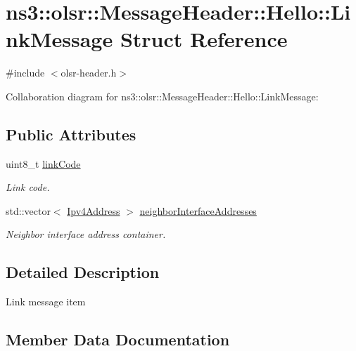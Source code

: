 \hypertarget{structns3_1_1olsr_1_1MessageHeader_1_1Hello_1_1LinkMessage}{}\section{ns3\+:\+:olsr\+:\+:Message\+Header\+:\+:Hello\+:\+:Link\+Message Struct Reference}
\label{structns3_1_1olsr_1_1MessageHeader_1_1Hello_1_1LinkMessage}


{\ttfamily \#include $<$olsr-\/header.\+h$>$}



Collaboration diagram for ns3\+:\+:olsr\+:\+:Message\+Header\+:\+:Hello\+:\+:Link\+Message\+:
\subsection*{Public Attributes}
\begin{DoxyCompactItemize}
\item 
uint8\+\_\+t \hyperlink{structns3_1_1olsr_1_1MessageHeader_1_1Hello_1_1LinkMessage_ac727c2646a24b15373c760a6e4e3e32a}{link\+Code}
\begin{DoxyCompactList}\small\item\em Link code. \end{DoxyCompactList}\item 
std\+::vector$<$ \hyperlink{classns3_1_1Ipv4Address}{Ipv4\+Address} $>$ \hyperlink{structns3_1_1olsr_1_1MessageHeader_1_1Hello_1_1LinkMessage_aed5e77e4f9eeb0a09abe818be1efe988}{neighbor\+Interface\+Addresses}
\begin{DoxyCompactList}\small\item\em Neighbor interface address container. \end{DoxyCompactList}\end{DoxyCompactItemize}


\subsection{Detailed Description}
Link message item 

\subsection{Member Data Documentation}
